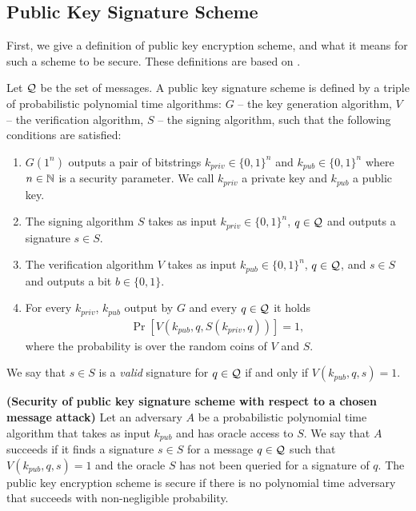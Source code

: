\subsection{Public Key Signature Scheme}
First, we give a definition of public key encryption scheme, and what it means for such a scheme to be secure.
These definitions are based on \cite{Goldreich:2004:FCV:975541}.

\begin{definition}
Let $\mathcal{Q}$ be the set of messages. A \textnormal{public key signature scheme} is defined by a triple of probabilistic polynomial time algorithms:
$G$ -- the key generation algorithm,
$V$ -- the verification algorithm,
$S$ -- the signing algorithm,
such that the following conditions are satisfied:
\begin{enumerate}[-]
  \item $G(1^n)$ outputs a pair of bitstrings $k_{priv} \in \{0,1\}^{n}$ and $k_{pub} \in \{0,1\}^{n}$ where $n \in \mathbb{N}$ is a security parameter.
    We call $k_{priv}$ a private key and $k_{pub}$ a public key.
  \item The signing algorithm $S$ takes as input $k_{priv} \in \{0,1\}^{n}$, $q \in \mathcal{Q}$ and outputs a signature $s \in S$.
  \item The verification algorithm $V$ takes as input $k_{pub} \in \{0,1\}^{n}$, $q \in \mathcal{Q}$, and $s \in S$ and outputs a bit $b \in \{0,1\}$.
  \item For every $k_{priv}$, $k_{pub}$ output by $G$ and every $q \in \mathcal{Q}$ it holds
    \begin{align*}
      \Pr[V(k_{pub}, q, S(k_{priv}, q))] = 1,
    \end{align*}
    where the probability is over the random coins of $V$ and $S$.
\end{enumerate}
\end{definition}
We say that $s \in S$ is a \textit{valid} signature for $q \in \mathcal{Q}$ if and only if $V(k_{pub}, q, s) = 1$.
%
%
\begin{definition}\textbf{(Security of public key signature scheme with respect to a chosen message attack)}
Let an \textnormal{adversary} $A$ be a probabilistic polynomial time algorithm that takes as input $k_{pub}$ and has oracle access to $S$.
We say that $A$ \textnormal{succeeds} if it finds a signature $s \in S$ for a message $q \in \mathcal{Q}$ such that $V(k_{pub}, q, s) = 1$
and the oracle $S$ has not been queried for a signature of $q$.
The public key encryption scheme is \textnormal{secure} if there is no polynomial time adversary that succeeds with non-negligible probability.
\end{definition}
